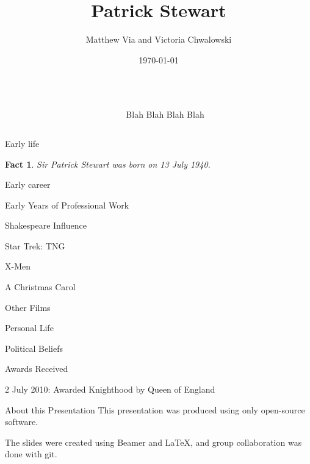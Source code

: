 \documentclass[xcolor=dvipsnames]{beamer}
\begin{document}
\author{Matthew Via and Victoria Chwalowski}
\title{Patrick Stewart}
\date{\today}
\newtheorem{fct}{Fact}
\begin{frame}{}
  \begin{columns}
    \begin{column}{0.5\textwidth}
      \titlepage
    \end{column}
    \begin{column}{0.5\textwidth}
      Blah Blah \newline Blah Blah
    \end{column}
  \end{columns}
\end{frame}

\begin{frame}{Early life}
  \begin{fct}
    Sir Patrick Stewart was born on 13 July 1940.
  \end{fct}
\end{frame}

\begin{frame}{Early career}

\end{frame}

\begin{frame}{Early Years of Professional Work}

\end{frame}
\begin{frame}{Shakespeare Influence}

\end{frame}
\begin{frame}{Star Trek: TNG}

\end{frame}
\begin{frame}{X-Men}

\end{frame}
\begin{frame}{A Christmas Carol}

\end{frame}
\begin{frame}{Other Films}

\end{frame}
\begin{frame}{Personal Life}

\end{frame}
\begin{frame}{Political Beliefs}

\end{frame}
\begin{frame}{Awards Received}
\begin{itemize}
2 July 2010: Awarded Knighthood by Queen of England
\end{itemize}
\end{frame}
\begin{frame}{About this Presentation}
This presentation was produced using only open-source software.

The slides were created using Beamer and LaTeX, and group collaboration was done
with git.
\end{frame}
\end{document}
